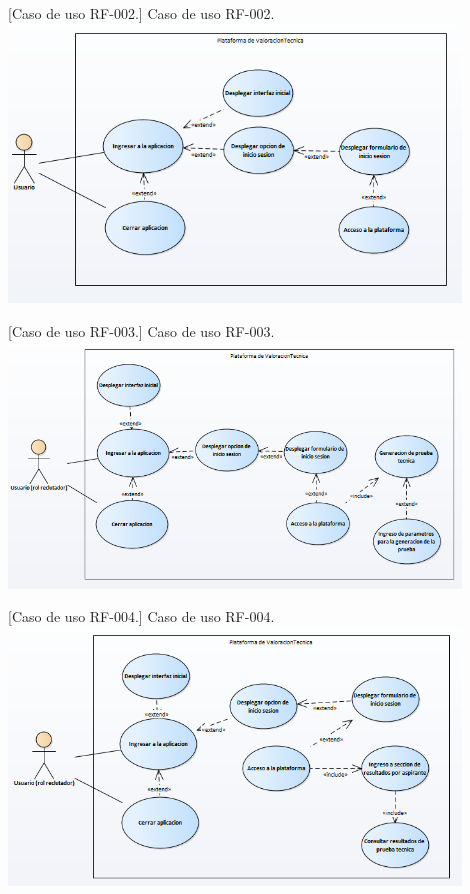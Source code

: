     \vspace{2mm}
    \begin{minipage}{0.9\textwidth}
    \centering
    [{Caso de uso RF-002.}]{ Caso de uso RF-002. }
    \label{caso2}
     \includegraphics[width=0.9\textwidth]{Images/casoUso2.png}
    \end{minipage}
    
    \vspace{2mm}
    \begin{minipage}{0.9\textwidth}
    \centering
    [{Caso de uso RF-003.}]{ Caso de uso RF-003. }
    \label{caso3}
     \includegraphics[width=0.9\textwidth]{Images/casoUso3.png}
    \end{minipage}
    
    \vspace{2mm}
    \begin{minipage}{0.9\textwidth}
    \centering
    [{Caso de uso RF-004.}]{ Caso de uso RF-004. }
    \label{caso4}
     \includegraphics[width=0.9\textwidth]{Images/casoUso4.png}
    \end{minipage}
    
